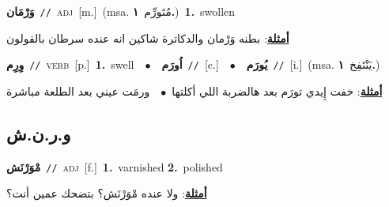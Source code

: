 \documentclass[10pt,a4paper,twoside]{article} %
\begin{document}
\begin{multicols}{2}
{\setlength\topsep{0pt}\textbf{\foreignlanguage{arabic}{وَرْمَان}}\ {\color{gray}\texttt{//}\color{black}}\ \textsc{adj}\ [m.]\ \color{gray}(msa. \foreignlanguage{arabic}{مُتَورِّم}~\foreignlanguage{arabic}{\textbf{١.}})\color{black}\ \textbf{1.}~swollen\  \begin{flushright}\color{gray}\foreignlanguage{arabic}{\textbf{\underline{\foreignlanguage{arabic}{أمثلة}}}: بطنه وَرْمان والدكاترة شاكين انه عنده سرطان بالقولون}\end{flushright}\color{black}} \vspace{2mm}

{\setlength\topsep{0pt}\textbf{\foreignlanguage{arabic}{وِرِم}}\ {\color{gray}\texttt{//}\color{black}}\ \textsc{verb}\ [p.]\ \textbf{1.}~swell\ \ $\bullet$\ \ \setlength\topsep{0pt}\textbf{\foreignlanguage{arabic}{اُورَم}}\ {\color{gray}\texttt{//}\color{black}}\ [c.]\ \ $\bullet$\ \ \setlength\topsep{0pt}\textbf{\foreignlanguage{arabic}{يُورَم}}\ {\color{gray}\texttt{//}\color{black}}\ [i.]\ \color{gray}(msa. \foreignlanguage{arabic}{يَنْتَفِخ}~\foreignlanguage{arabic}{\textbf{١.}})\color{black}\  \begin{flushright}\color{gray}\foreignlanguage{arabic}{\textbf{\underline{\foreignlanguage{arabic}{أمثلة}}}: خفت إِيدي تورَم بعد هالضربة اللي أكلتها\ $\bullet$\ \  ورمَت عيني بعد الطلعة مباشرة}\end{flushright}\color{black}} \vspace{2mm}

\vspace{-3mm}
\subsection*{\color{blue}\foreignlanguage{arabic}{و.ر.ن.ش}\color{blue}{}} 

{\setlength\topsep{0pt}\textbf{\foreignlanguage{arabic}{مْوَرْنَش}}\ {\color{gray}\texttt{//}\color{black}}\ \textsc{adj}\ [f.]\ \textbf{1.}~varnished  \textbf{2.}~polished\  \begin{flushright}\color{gray}\foreignlanguage{arabic}{\textbf{\underline{\foreignlanguage{arabic}{أمثلة}}}: ولا عنده مْوَرْنَش؟ بتضحك عمين أنت؟}\end{flushright}\color{black}} \vspace{2mm}


\end{multicols}
\end{document}
